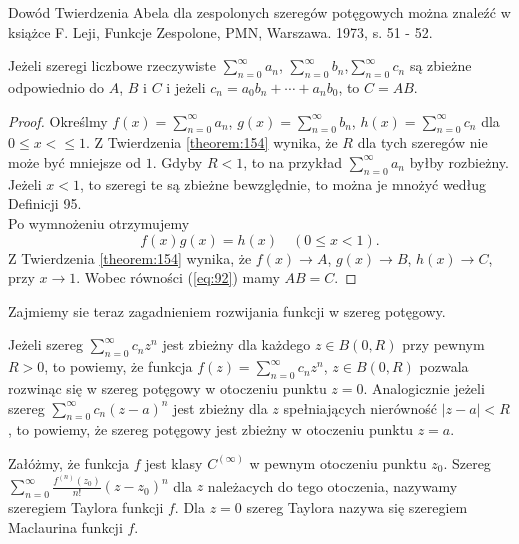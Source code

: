\documentclass[leqno]{article}
\begin{document}
\begin{justify}
Dowód Twierdzenia Abela dla zespolonych szeregów potęgowych można znaleźć w książce F. Leji, Funkcje Zespolone, PMN, Warszawa. 1973, s. 51 - 52.

\begin{wniosek}
{
    Jeżeli szeregi liczbowe rzeczywiste $\sum\limits_{n=0}^{\infty}a_n$, $\sum\limits_{n=0}^{\infty}b_n$,$\sum\limits_{n=0}^{\infty}c_n$
    są zbieżne odpowiednio do $A$, $B$ i $C$ i jeżeli $c_n = a_0b_n + \cdots + a_n b_0$, to $C = AB$.
}
\end{wniosek}

\begin{proof}
    Określmy $f(x) = \sum\limits_{n=0}^{\infty}a_n$, $g(x) = \sum\limits_{n=0}^{\infty}b_n$, $h(x) = \sum\limits_{n=0}^{\infty}c_n$ dla $0 \leqslant x < \leqslant 1$.
    Z Twierdzenia \ref{theorem:154} wynika, że $R$ dla tych szeregów nie może być mniejsze od $1$. Gdyby $R < 1$, to na przykład 
    $\sum\limits_{n=0}^{\infty}a_n$ byłby rozbieżny. Jeżeli $x < 1$, to szeregi te są zbieżne bewzględnie, to można je mnożyć według Definicji 95. \\
    Po wymnożeniu otrzymujemy
    \begin{equation}\label{eq:92}
        f(x)g(x) = h(x) \quad (0 \leqslant x < 1).
    \end{equation}
    Z Twierdzenia \ref{theorem:154} wynika, że $f(x) \to A$, $g(x) \to B$, $h(x) \to C$, przy $x \to 1$. 
    Wobec równości (\ref{eq:92}) mamy $AB = C$.
\end{proof}

Zajmiemy sie teraz zagadnieniem rozwijania funkcji w szereg potęgowy.

\begin{defn}
    Jeżeli szereg $\sum\limits_{n=0}^{\infty}c_n z^n$ jest zbieżny dla każdego $z \in B(0, R)$ przy pewnym $R > 0$, to powiemy, że funkcja $f(z) = \sum\limits_{n=0}^{\infty}c_n z^n$, $z \in B(0, R)$ pozwala rozwinąc się w szereg potęgowy w otoczeniu punktu $z = 0$. Analogicznie jeżeli szereg $\sum\limits_{n=0}^{\infty}c_n {(z-a)}^n$ jest zbieżny dla $z$ spełniających nierówność
    $|z-a| < R$, to powiemy, że szereg potęgowy jest zbieżny w otoczeniu punktu $z = a$. 
\end{defn}

\begin{defn}
    Załóżmy, że funkcja $f$ jest klasy $C^{(\infty)}$ w pewnym otoczeniu punktu $z_0$. Szereg 
    $\sum\limits_{n=0}^{\infty} \frac{f^{(n)}(z_0)}{n!}{(z - z_0)}^n$ dla $z$ należacych do tego otoczenia, nazywamy szeregiem Taylora funkcji $f$.
    Dla $z = 0$ szereg Taylora nazywa się szeregiem Maclaurina funkcji $f$.


\end{defn}
\end{justify}
\end{document}
